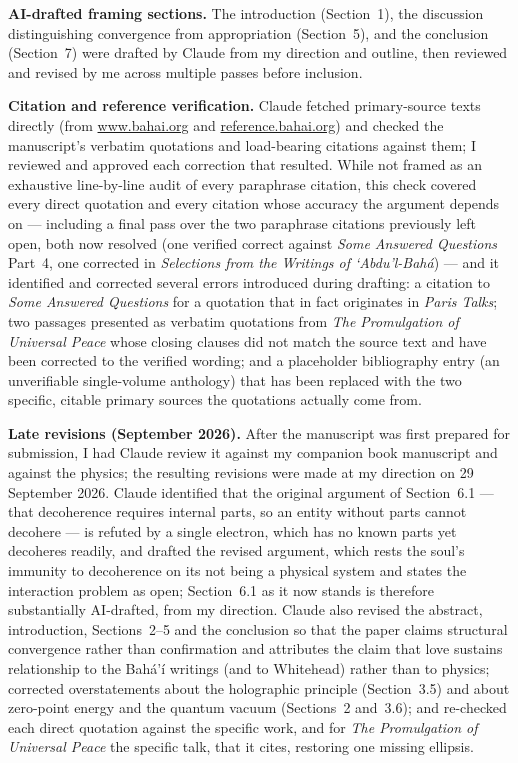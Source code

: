 \documentclass[12pt, a4paper]{article}
\begin{document}
\textbf{AI-drafted framing sections.} The introduction (Section~1), the discussion
distinguishing convergence from appropriation (Section~5), and the conclusion
(Section~7) were drafted by Claude from my direction and outline, then reviewed and
revised by me across multiple passes before inclusion.

\textbf{Citation and reference verification.} Claude fetched primary-source texts
directly (from \url{www.bahai.org} and \url{reference.bahai.org}) and checked the
manuscript's verbatim quotations and load-bearing citations against them; I reviewed and
approved each correction that resulted. While not framed as an exhaustive line-by-line
audit of every paraphrase citation, this check covered every direct quotation and every
citation whose accuracy the argument depends on --- including a final pass over the two
paraphrase citations previously left open, both now resolved (one verified correct
against \emph{Some Answered Questions} Part~4, one corrected in \emph{Selections from the
Writings of `Abdu'l-Bah\'a}) --- and it identified and corrected several
errors introduced during drafting: a citation to \emph{Some Answered Questions} for a
quotation that in fact originates in \emph{Paris Talks}; two passages presented as
verbatim quotations from \emph{The Promulgation of Universal Peace} whose closing
clauses did not match the source text and have been corrected to the verified wording;
and a placeholder bibliography entry (an unverifiable single-volume anthology) that has
been replaced with the two specific, citable primary sources the quotations actually
come from.

\textbf{Late revisions (September 2026).} After the manuscript was first prepared for
submission, I had Claude review it against my companion book manuscript and against the
physics; the resulting revisions were made at my direction on 29 September 2026. Claude
identified that the original argument of Section~6.1 --- that decoherence requires
internal parts, so an entity without parts cannot decohere --- is refuted by a single
electron, which has no known parts yet decoheres readily, and drafted the revised
argument, which rests the soul's immunity to decoherence on its not being a physical
system and states the interaction problem as open; Section~6.1 as it now stands is
therefore substantially AI-drafted, from my direction. Claude also revised the abstract,
introduction, Sections~2--5 and the conclusion so that the paper claims structural
convergence rather than confirmation and attributes the claim that love sustains
relationship to the Bahá'í writings (and to Whitehead) rather than to physics; corrected
overstatements about the holographic principle (Section~3.5) and about zero-point energy
and the quantum vacuum (Sections~2 and~3.6); and re-checked each direct quotation against
the specific work, and for \emph{The Promulgation of Universal Peace} the specific talk,
that it cites, restoring one missing ellipsis.
\end{document}
